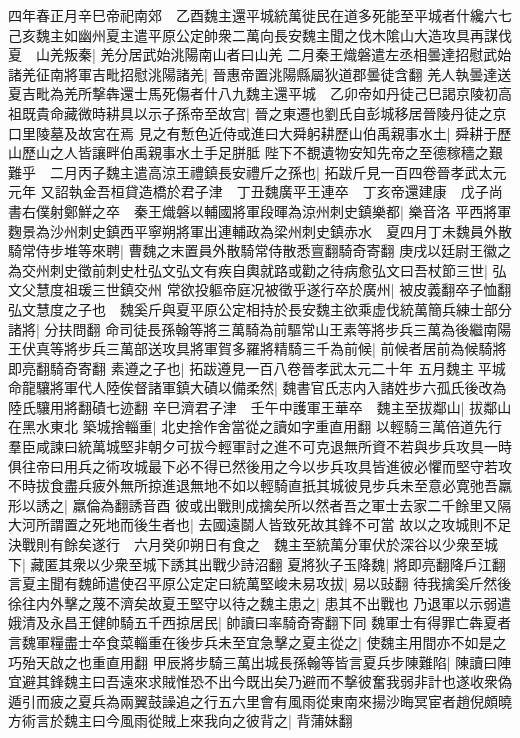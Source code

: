 四年春正月辛巳帝祀南郊　乙酉魏主還平城統萬徙民在道多死能至平城者什纔六七己亥魏主如幽州夏主遣平原公定帥衆二萬向長安魏主聞之伐木隂山大造攻具再謀伐夏　山羌叛秦|{
	羌分居武始洮陽南山者曰山羌}
二月秦王熾磐遣左丞相曇達招慰武始諸羌征南將軍吉毗招慰洮陽諸羌|{
	晉惠帝置洮陽縣屬狄道郡曇徒含翻}
羌人執曇達送夏吉毗為羌所撃犇還士馬死傷者什八九魏主還平城　乙卯帝如丹徒己巳謁京陵初高祖既貴命藏微時耕具以示子孫帝至故宫|{
	晉之東遷也劉氏自彭城移居晉陵丹徒之京口里陵墓及故宮在焉}
見之有慙色近侍或進曰大舜躬耕歷山伯禹親事水土|{
	舜耕于歷山歷山之人皆讓畔伯禹親事水土手足胼胝}
陛下不覩遺物安知先帝之至德稼穡之艱難乎　二月丙子魏主遣高涼王禮鎮長安禮斤之孫也|{
	拓跋斤見一百四卷晉孝武太元元年}
又詔執金吾桓貸造橋於君子津　丁丑魏廣平王連卒　丁亥帝還建康　戊子尚書右僕射鄭鮮之卒　秦王熾磐以輔國將軍段暉為涼州刺史鎮樂都|{
	樂音洛}
平西將軍麴景為沙州刺史鎮西平寧朔將軍出連輔政為梁州刺史鎮赤水　夏四月丁未魏員外散騎常侍步堆等來聘|{
	曹魏之末置員外散騎常侍散悉亶翻騎奇寄翻}
庚戌以廷尉王徽之為交州刺史徵前刺史杜弘文弘文有疾自輿就路或勸之待病愈弘文曰吾杖節三世|{
	弘文父慧度祖瑗三世鎮交州}
常欲投軀帝庭况被徵乎遂行卒於廣州|{
	被皮義翻卒子恤翻}
弘文慧度之子也　魏奚斤與夏平原公定相持於長安魏主欲乘虚伐統萬簡兵練士部分諸將|{
	分扶問翻}
命司徒長孫翰等將三萬騎為前驅常山王素等將步兵三萬為後繼南陽王伏真等將步兵三萬部送攻具將軍賀多羅將精騎三千為前候|{
	前候者居前為候騎將即亮翻騎奇寄翻}
素遵之子也|{
	拓跋遵見一百八卷晉孝武太元二十年}
五月魏主平城命龍驤將軍代人陸俟督諸軍鎮大磧以備柔然|{
	魏書官氏志内入諸姓步六孤氏後改為陸氏驤用將翻磧七迹翻}
辛巳濟君子津　壬午中護軍王華卒　魏主至拔鄰山|{
	拔鄰山在黑水東北}
築城捨輜重|{
	北史捨作舍當從之讀如字重直用翻}
以輕騎三萬倍道先行羣臣咸諫曰統萬城堅非朝夕可拔今輕軍討之進不可克退無所資不若與步兵攻具一時俱往帝曰用兵之術攻城最下必不得已然後用之今以步兵攻具皆進彼必懼而堅守若攻不時拔食盡兵疲外無所掠進退無地不如以輕騎直扺其城彼見步兵未至意必寛弛吾羸形以誘之|{
	羸倫為翻誘音酉}
彼或出戰則成擒矣所以然者吾之軍士去家二千餘里又隔大河所謂置之死地而後生者也|{
	去國遠鬬人皆致死故其鋒不可當}
故以之攻城則不足決戰則有餘矣遂行　六月癸卯朔日有食之　魏主至統萬分軍伏於深谷以少衆至城下|{
	藏匿其衆以少衆至城下誘其出戰少詩沼翻}
夏將狄子玉降魏|{
	將即亮翻降戶江翻}
言夏主聞有魏師遣使召平原公定定曰統萬堅峻未易攻拔|{
	易以䜴翻}
待我擒奚斤然後徐往内外擊之蔑不濟矣故夏王堅守以待之魏主患之|{
	患其不出戰也}
乃退軍以示弱遣娥清及永昌王健帥騎五千西掠居民|{
	帥讀曰率騎奇寄翻下同}
魏軍士有得罪亡犇夏者言魏軍糧盡士卒食菜輜重在後步兵未至宜急擊之夏主從之|{
	使魏主用間亦不如是之巧殆天啟之也重直用翻}
甲辰將步騎三萬出城長孫翰等皆言夏兵步陳難陷|{
	陳讀曰陣}
宜避其鋒魏主曰吾遠來求賊惟恐不出今既出矣乃避而不撃彼奮我弱非計也遂收衆偽遁引而疲之夏兵為兩翼鼓譟追之行五六里會有風雨從東南來揚沙晦冥宦者趙倪頗曉方術言於魏主曰今風雨從賊上來我向之彼背之|{
	背蒲妹翻}
